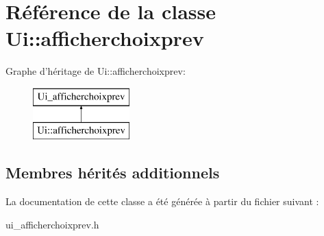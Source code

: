 \hypertarget{class_ui_1_1afficherchoixprev}{\section{Référence de la classe Ui\+:\+:afficherchoixprev}
\label{class_ui_1_1afficherchoixprev}
}
Graphe d'héritage de Ui\+:\+:afficherchoixprev\+:\begin{figure}[H]
\begin{center}
\leavevmode
\includegraphics[height=2.000000cm]{class_ui_1_1afficherchoixprev}
\end{center}
\end{figure}
\subsection*{Membres hérités additionnels}


La documentation de cette classe a été générée à partir du fichier suivant \+:\begin{DoxyCompactItemize}
\item 
ui\+\_\+afficherchoixprev.\+h\end{DoxyCompactItemize}
